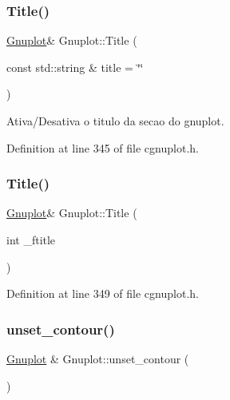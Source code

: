 \subsubsection{\texorpdfstring{Title()}{Title()}\hspace{0.1cm}{\footnotesize\ttfamily [1/2]}}
{\footnotesize\ttfamily \hyperlink{class_gnuplot}{Gnuplot}\& Gnuplot\+::\+Title (\begin{DoxyParamCaption}\item[{const std\+::string \&}]{title = {\ttfamily \char`\"{}\char`\"{}} }\end{DoxyParamCaption})\hspace{0.3cm}{\ttfamily [inline]}}



Ativa/\+Desativa o titulo da secao do gnuplot. 



Definition at line 345 of file cgnuplot.\+h.

\mbox{\label{class_gnuplot_afeab18e210616ae239adb7d816ecb2e9}} 
\subsubsection{\texorpdfstring{Title()}{Title()}\hspace{0.1cm}{\footnotesize\ttfamily [2/2]}}
{\footnotesize\ttfamily \hyperlink{class_gnuplot}{Gnuplot}\& Gnuplot\+::\+Title (\begin{DoxyParamCaption}\item[{int}]{\+\_\+ftitle }\end{DoxyParamCaption})\hspace{0.3cm}{\ttfamily [inline]}}



Definition at line 349 of file cgnuplot.\+h.

\mbox{\label{class_gnuplot_a39d10e6ce85875939a9c594d132a10d7}} 
\subsubsection{\texorpdfstring{unset\+\_\+contour()}{unset\_contour()}}
{\footnotesize\ttfamily \hyperlink{class_gnuplot}{Gnuplot} \& Gnuplot\+::unset\+\_\+contour (\begin{DoxyParamCaption}{ }\end{DoxyParamCaption})}



